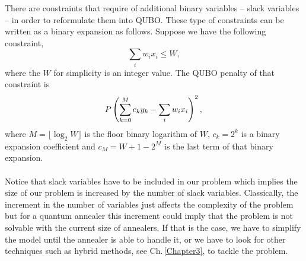 There are constraints that require of additional binary variables -- slack variables -- in order to reformulate them into QUBO. These type of constraints can be written as a binary expansion as follows. Suppose we have the following constraint,
\begin{equation}
    \sum_{i}w_{i}x_{i}\leq W,
\end{equation}
where the $W$ for simplicity is an integer value. The QUBO penalty of that constraint is
\begin{equation}
    P \left(\sum_{k=0}^{M}c_{k}y_{k} - \sum_{i}w_{i}x_{i} \right)^{2}, \\
\end{equation}
where $M = \lfloor\log_{2}{W}\rfloor$ is the floor binary logarithm of $W$, $c_{k} = 2^{k}$ is a binary expansion coefficient and $c_{M} = W + 1 - 2^{M}$ is the last term of that binary expansion. \\\\
Notice that slack variables have to be included in our problem which implies the size of our problem is increased by the number of slack variables. Classically, the increment in the number of variables just affects the complexity of the problem but for a quantum annealer this increment could imply that the problem is not solvable with the current size of annealers. If that is the case, we have to simplify the model until the annealer is able to handle it, or we have to look for other techniques such as hybrid methods, see Ch.\,\ref{Chapter3}, to tackle the problem.

